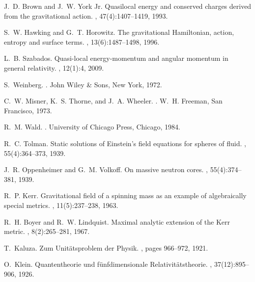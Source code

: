 \documentclass[11pt]{article}
\begin{document}
\begin{thebibliography}{10}

J.~D. Brown and J.~W. York Jr.
\newblock Quasilocal energy and conserved charges derived from the gravitational action.
, 47(4):1407--1419, 1993.

S.~W. Hawking and G.~T. Horowitz.
\newblock The gravitational Hamiltonian, action, entropy and surface terms.
, 13(6):1487--1498, 1996.

L.~B. Szabados.
\newblock Quasi-local energy-momentum and angular momentum in general relativity.
, 12(1):4, 2009.

S.~Weinberg.
.
\newblock John Wiley \& Sons, New York, 1972.

C.~W. Misner, K.~S. Thorne, and J.~A. Wheeler.
.
\newblock W.~H. Freeman, San Francisco, 1973.

R.~M. Wald.
.
\newblock University of Chicago Press, Chicago, 1984.

R.~C. Tolman.
\newblock Static solutions of Einstein's field equations for spheres of fluid.
, 55(4):364--373, 1939.

J.~R. Oppenheimer and G.~M. Volkoff.
\newblock On massive neutron cores.
, 55(4):374--381, 1939.

R.~P. Kerr.
\newblock Gravitational field of a spinning mass as an example of algebraically special metrics.
, 11(5):237--238, 1963.

R.~H. Boyer and R.~W. Lindquist.
\newblock Maximal analytic extension of the Kerr metric.
, 8(2):265--281, 1967.

T.~Kaluza.
\newblock Zum Unitätsproblem der Physik.
, pages 966--972, 1921.

O.~Klein.
\newblock Quantentheorie und fünfdimensionale Relativitätstheorie.
, 37(12):895--906, 1926.

\end{thebibliography}
\end{document}
